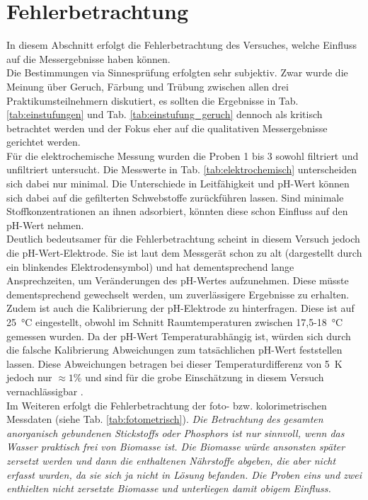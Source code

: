 \chapter{Fehlerbetrachtung}
\label{sec:fehler}
In diesem Abschnitt erfolgt die Fehlerbetrachtung des Versuches, welche Einfluss auf die Messergebnisse haben können.\\
Die Bestimmungen via Sinnesprüfung erfolgten sehr subjektiv. Zwar wurde die Meinung über Geruch, Färbung und Trübung zwischen allen drei Praktikumsteilnehmern diskutiert, es sollten die Ergebnisse in Tab. \ref{tab:einstufungen} und Tab. \ref{tab:einstufung_geruch} dennoch als kritisch betrachtet werden und der Fokus eher auf die qualitativen Messergebnisse gerichtet werden.\\
Für die elektrochemische Messung wurden die Proben 1 bis 3 sowohl filtriert und unfiltriert untersucht. Die Messwerte in Tab. \ref{tab:elektrochemisch} unterscheiden sich dabei nur minimal. Die Unterschiede in Leitfähigkeit und pH-Wert können sich dabei auf die gefilterten Schwebstoffe zurückführen lassen. Sind minimale Stoffkonzentrationen an ihnen adsorbiert, könnten diese schon Einfluss auf den pH-Wert nehmen.\\
Deutlich bedeutsamer für die Fehlerbetrachtung scheint in diesem Versuch jedoch die pH-Wert-Elektrode. Sie ist laut dem Messgerät schon zu alt (dargestellt durch ein blinkendes Elektrodensymbol) und hat dementsprechend lange Ansprechzeiten, um Veränderungen des pH-Wertes aufzunehmen. Diese müsste dementsprechend gewechselt werden, um zuverlässigere Ergebnisse zu erhalten. Zudem ist auch die Kalibrierung der pH-Elektrode zu hinterfragen. Diese ist auf \SI{25}{\celsius} eingestellt, obwohl im Schnitt Raumtemperaturen zwischen 17,5-\SI{18}{\celsius} gemessen wurden. Da der pH-Wert Temperaturabhängig ist, würden sich durch die falsche Kalibrierung Abweichungen zum tatsächlichen pH-Wert feststellen lassen. Diese Abweichungen betragen bei dieser Temperaturdifferenz von \SI{5}{\kelvin} jedoch nur $\approx 1\%$ und sind für die grobe Einschätzung in diesem Versuch vernachlässigbar \cite{WasserPH}. \\
Im Weiteren erfolgt die Fehlerbetrachtung der foto- bzw. kolorimetrischen Messdaten (siehe Tab. \ref{tab:fotometrisch}).
\textit{Die Betrachtung des gesamten anorganisch gebundenen Stickstoffs oder Phosphors ist nur sinnvoll, wenn das Wasser praktisch frei von Biomasse ist. Die Biomasse würde ansonsten später zersetzt werden und dann die enthaltenen Nährstoffe abgeben, die aber nicht erfasst wurden, da sie sich ja nicht in Lösung befanden. Die Proben eins und zwei enthielten nicht zersetzte Biomasse und unterliegen damit obigem Einfluss.} \\
